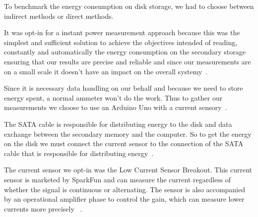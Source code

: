 To benchmark the energy consumption on disk storage, we had to choose between indirect methods or direct methods.



It was opt-in for a instant power measurement approach because this was the simplest and sufficient solution to achieve the objectives intended of reading, constantly and automatically the energy consumption on the secondary storage ensuring that our results are precise and reliable and since our measurements are on a small scale it doesn't have an impact on the overall systemy~\cite{portela2016}.

Since it is necessary data handling on our behalf and because we need to store energy spent, a normal ammeter won't do the work. Thus to gather our measurements we choose to use an Arduino Uno with a current sensory~\cite{portela2016}.

The SATA cable is responsible for distributing energy to the disk and data exchange between the secondary memory and the computer. So to get the energy on the disk we must connect the current sensor to the connection of the SATA cable that is responsible for distributing energy~\cite{portela2016}.

The current sensor we opt-in was the Low Current Sensor Breakout. This current sensor is marketed by SparkFun and can measure the current regardless of whether the signal is continuous or alternating. The sensor is also accompanied by an operational amplifier phase to control the gain, which can measure lower currents more precisely ~\cite{portela2016}.

